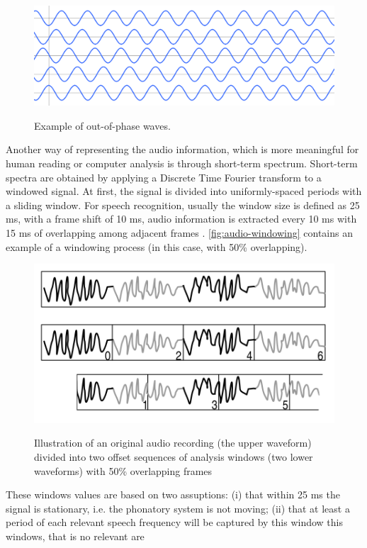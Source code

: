 \begin{figure}[!ht]
        \myfloatalign
        {\includegraphics[width=.66\linewidth]{gfx/out-of-phase-waves.png}}
        \caption{Example of out-of-phase waves.}
        \label{fig:out-of-phase-waves}
\end{figure}

Another way of representing the audio information, which is more meaningful for human reading
or computer analysis is through short-term spectrum. Short-term spectra are obtained by applying
a Discrete Time Fourier transform to a windowed signal. At first, the signal is divided
into uniformly-spaced periods with a sliding window. For speech recognition, usually the window size is defined as 25 ms, 
with a frame shift of 10 ms, audio information is extracted every 10 ms with 15 ms of overlapping
among adjacent frames \cite{Huang2001}. \autoref{fig:audio-windowing} contains an example of a windowing process (in this case, 
with 50\% overlapping).

\begin{figure}[!ht]
        \myfloatalign
        {\includegraphics[width=.66\linewidth]{gfx/audio-windowing.png}}
        \caption{Illustration of an original audio recording (the upper waveform) divided into two
offset sequences of analysis windows (two lower waveforms) with 50\% overlapping frames \cite{McLoughlin2009}}
        \label{fig:audio-windowing}
\end{figure}

These windows values are based on two assuptions: (i) that within 25 ms the signal is stationary, i.e.
the phonatory system is not moving; (ii) that at least a period of each relevant speech frequency will 
be captured by this window
this windows, that is no relevant are 

